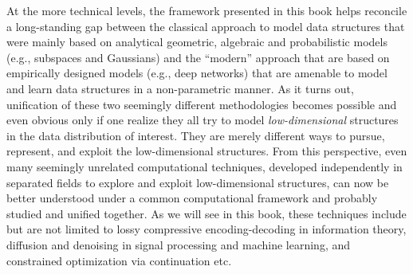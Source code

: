 \documentclass[../../book-main.tex]{subfiles}
\begin{document}
At the more technical levels, the framework presented in this book helps reconcile a long-standing gap between the classical approach to model data structures that were mainly based on analytical geometric, algebraic and probabilistic models (e.g., subspaces and Gaussians) and the ``modern'' approach that are based on empirically designed models (e.g., deep networks) that are amenable to model and learn data structures in a non-parametric manner. As it turns out, unification of these two seemingly different methodologies becomes possible and even obvious only if one realize they all try to model {\em low-dimensional} structures in the data distribution of interest. They are merely different ways to pursue, represent, and exploit the low-dimensional structures. From this perspective, even many seemingly unrelated computational techniques, developed independently in separated fields to explore and exploit low-dimensional structures, can now be better understood under a common computational framework and probably studied and unified together. As we will see in this book, these techniques include but are not limited to lossy compressive encoding-decoding in information theory, diffusion and denoising in signal processing and machine learning, and constrained optimization via continuation etc. 
\end{document}

